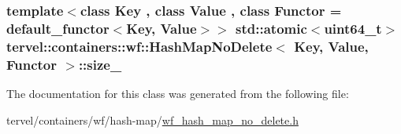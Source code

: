 \subsubsection[{size\+\_\+}]{\setlength{\rightskip}{0pt plus 5cm}template$<$class Key , class Value , class Functor  = default\+\_\+functor$<$\+Key, Value$>$$>$ std\+::atomic$<$uint64\+\_\+t$>$ {\bf tervel\+::containers\+::wf\+::\+Hash\+Map\+No\+Delete}$<$ Key, {\bf Value}, Functor $>$\+::size\+\_\+\hspace{0.3cm}{\ttfamily [private]}}\label{classtervel_1_1containers_1_1wf_1_1_hash_map_no_delete_a48a1191506c1beadd156e234e037126a}


The documentation for this class was generated from the following file\+:\begin{DoxyCompactItemize}
\item 
tervel/containers/wf/hash-\/map/\hyperlink{wf__hash__map__no__delete_8h}{wf\+\_\+hash\+\_\+map\+\_\+no\+\_\+delete.\+h}\end{DoxyCompactItemize}
